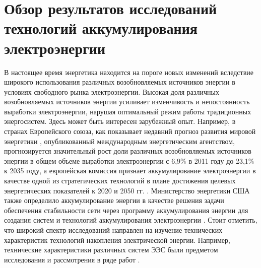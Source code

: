 \section{Обзор результатов исследований технологий аккумулирования электроэнергии}

В настоящее время энергетика находится на пороге новых изменений вследствие широкого использования различных возобновляемых источников энергии в условиях свободного рынка электроэнергии.
Высокая доля различных возобновляемых источников энергии усиливает изменчивость и непостоянность выработки электроэнергии, нарушая оптимальный режим работы традиционных %
энергосистем.
Здесь может быть интересен зарубежный опыт.
Например, в странах Европейского союза, как показывает недавний прогноз развития мировой энергетики \cite{IEA1%
}, опубликованный международным энергетическим агентством, прогнозируется значительный рост доли различных возобновляемых источников энергии в общем объеме выработки электроэнергии с 6,9\% в 2011 году до 23,1\% к 2035 году, а европейская комиссия признает аккумулирование электроэнергии в качестве одной из стратегических технологий в плане достижения целевых энергетических показателей к 2020 и 2050 гг. \cite{EuroCom%
}.
Министерство энергетики США также определило аккумулирование энергии в качестве решения задачи обеспечения стабильности сети через программу аккумулирования энергии для создания систем и технологий аккумулирования электроэнергии \cite{Sandia%
}.
Стоит отметить, что широкий спектр исследований направлен на изучение технических характеристик технологий накопления электрической энергии.
Например, технические характеристики различных систем ЭЭС были предметом исследования и рассмотрения в ряде работ \cite{Evans20124141,IEA5,Hall20084352,Hadjipaschalis20091513,Ibrahim20081221,Chen2009291,Gazarian2011,Baker20084368,DiazGonzalez20122154}.

